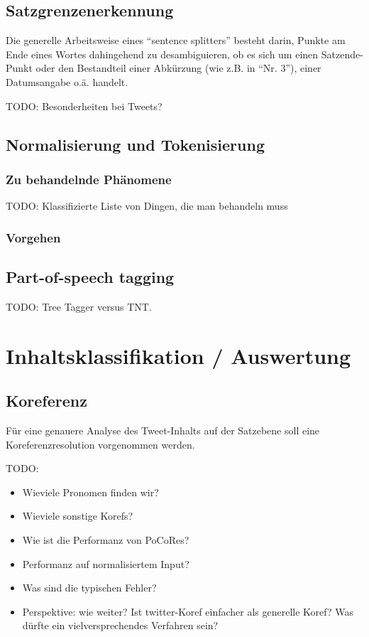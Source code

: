 \documentclass[11pt]{article}
\begin{document}
\subsection{Satzgrenzenerkennung}

Die generelle Arbeitsweise eines ``sentence splitters'' besteht darin,
Punkte am Ende eines Wortes dahingehend zu desambiguieren, ob es sich
um einen Satzende-Punkt oder den Bestandteil einer Abkürzung (wie
z.B. in ``Nr. 3''), einer Datumsangabe o.ä. handelt. 

TODO: Besonderheiten bei Tweets?


\subsection{Normalisierung und Tokenisierung}

\subsubsection{Zu behandelnde Phänomene}

TODO: Klassifizierte Liste von Dingen, die man behandeln muss

\subsubsection{Vorgehen}


\subsection{Part-of-speech tagging}

TODO: Tree Tagger versus TNT.

\section{Inhaltsklassifikation / Auswertung}

\subsection{Koreferenz}
Für eine genauere Analyse des Tweet-Inhalts auf der Satzebene soll
eine Koreferenzresolution vorgenommen werden.

TODO:
\begin{itemize}
\item Wieviele Pronomen finden wir?
\item Wieviele sonstige Korefs?
\item Wie ist die Performanz von PoCoRes?
\item Performanz auf normalisiertem Input?
\item Was sind die typischen Fehler?
\item Perspektive: wie weiter? Ist twitter-Koref einfacher als
  generelle Koref? Was dürfte ein vielversprechendes Verfahren sein?
\end{itemize}
\end{document}
